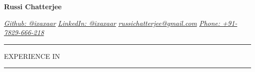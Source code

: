 \documentclass[10pt]{article} %
\begin{document}
\begin{center}
\Huge\textbf{Russi Chatterjee}
\end{center}

\noindent\href{https://github.com/ixaxaar}{\textit{\textcolor{RoyalPurple}{Github: @ixaxaar}}} \hspace{20pt} \href{http://in.linkedin.com/in/ixaxaar/}{\textit{\textcolor{RoyalPurple}{LinkedIn: @ixaxaar}}} \hspace{20pt}
\href{mailto:russichatterjee@gmail.com}{\textit{\textcolor{RoyalPurple}{russichatterjee@gmail.com}}} \hspace{20pt} \href{tel:917829666218}{\textit{\textcolor{RoyalPurple}{Phone: +91-7829-666-218}}}
\newline
\newline
{}

\noindent\textcolor{Emerald}{\rule{17cm}{1.8pt}}

\newline

\noindent\large{EXPERIENCE IN}

\noindent\textcolor{Emerald}{\rule{17cm}{1.8pt}}
\end{document}
